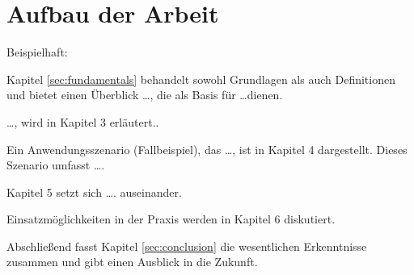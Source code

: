 \makeatletter\ifthesis@masterthesis
\section{Aufbau der Arbeit}

Beispielhaft:

Kapitel \ref{sec:fundamentals} behandelt sowohl Grundlagen als auch Definitionen und bietet einen Überblick \dots, die als Basis für \dots dienen.

\dots, wird in Kapitel 3 erläutert..

Ein Anwendungsszenario (Fallbeispiel), das \dots, ist in Kapitel 4 dargestellt. Dieses Szenario umfasst \dots.

Kapitel 5 setzt sich \dots. auseinander.

Einsatzmöglichkeiten in der Praxis werden in Kapitel 6 diskutiert.

Abschließend fasst Kapitel \ref{sec:conclusion} die wesentlichen Erkenntnisse zusammen und gibt einen Ausblick in die Zukunft.
\fi\makeatother

